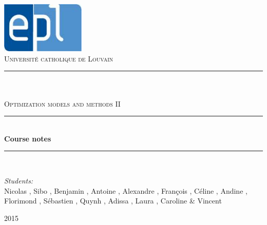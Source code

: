 \newcommand{\HRule}{\rule{\linewidth}{0.5mm}}

\begin{titlepage}
	
\begin{center}

\includegraphics[width=0.30\textwidth]{images/epl.jpg}\\[1cm]    

\textsc{\LARGE Universit\'e catholique de Louvain}\\[1.5cm]

\HRule \\[0.5cm]

\textsc{\Large {}}\\[0.2cm]
\textsc{\Large Optimization models and methods II}\\[0.5cm]


\HRule \\[2cm]
{\huge \bfseries Course notes}\\[1cm]

\HRule \\[1.5cm]

\begin{minipage}{0.8\textwidth}
\begin{flushleft} \large
\emph{Students:}\\
Nicolas , Sibo , Benjamin , Antoine , Alexandre , François , Céline , Andine , Florimond , Sébastien , Quynh , Adissa , Laura , Caroline  \& Vincent 
\end{flushleft}
\end{minipage}


\vfill

{\large  2015}

\end{center}	
	
	
\end{titlepage}

